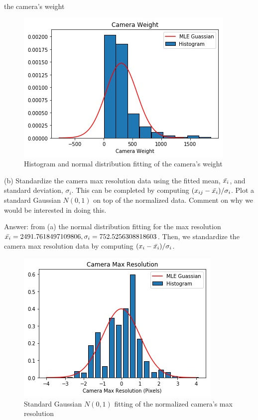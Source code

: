 \documentclass{article}
\begin{document}
the camera's weight
\begin{figure}[ht]
\centering
\includegraphics[scale=0.5]{w5a2.jpg}
\caption{Histogram and normal distribution fitting of the camera's weight}
\end{figure}
\newline
(b) Standardize the camera max resolution data using the fitted mean, $\Bar{x_{i}}$, and standard deviation, $\sigma_{i}$. This can be completed by computing $(x_{ij}-\Bar{x_{i}})/\sigma_{i}$. Plot a standard Gaussian $N(0,1)$ on top of the normalized data. Comment on why we would be interested in doing this.

Answer:
from (a) the normal distribution fitting for the max resolution
$\Bar{x_i} = 2491.7618497109806, \sigma_{i} = 752.5256308818603$.
Then, we standardize the camera max resolution data by computing $(x_{i}-\Bar{x_{i}})/\sigma_{i}$.

\begin{figure}[ht]
\centering
\includegraphics[scale=0.5]{w5b1.jpg}
\caption{Standard Gaussian $N(0,1)$ fitting of the normalized camera's max resolution}
\end{figure}
\end{document}
